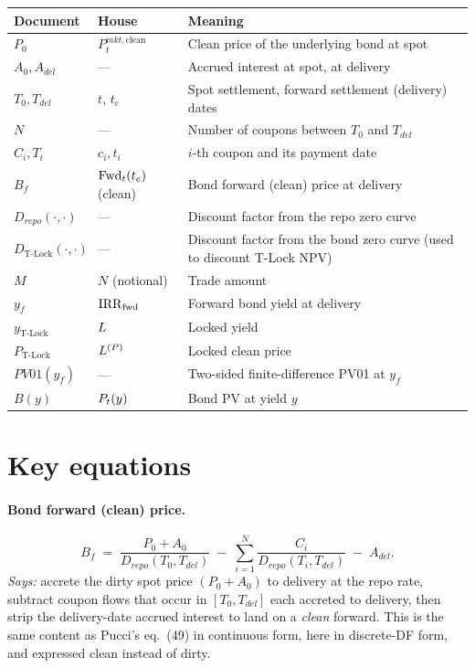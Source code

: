 \documentclass[11pt,a4paper]{article}
\begin{document}
\begin{tabular}{@{}p{3cm}p{3.5cm}p{8.5cm}@{}}
\toprule
Document         & House                  & Meaning \\
\midrule
$P_0$            & $P^{mkt,\text{clean}}_t$ & Clean price of the underlying bond at spot \\
$A_0, A_{del}$   & ---                     & Accrued interest at spot, at delivery \\
$T_0, T_{del}$   & $t$, $t_e$              & Spot settlement, forward settlement (delivery) dates \\
$N$              & ---                     & Number of coupons between $T_0$ and $T_{del}$ \\
$C_i, T_i$       & $c_i, t_i$              & $i$-th coupon and its payment date \\
$B_f$            & $\mathrm{Fwd}_{t}(t_e)$ (clean) & Bond forward (clean) price at delivery \\
$D_{repo}(\cdot,\cdot)$ & ---              & Discount factor from the repo zero curve \\
$D_{\text{T-Lock}}(\cdot,\cdot)$ & ---     & Discount factor from the bond zero curve (used to discount T-Lock NPV) \\
$M$              & $N$ (notional)          & Trade amount \\
$y_f$            & $\mathrm{IRR}_{\text{fwd}}$     & Forward bond yield at delivery \\
$y_{\text{T-Lock}}$ & $L$              & Locked yield \\
$P_{\text{T-Lock}}$ & $L^{(P)}$        & Locked clean price \\
$PV01(y_f)$      & ---                     & Two-sided finite-difference PV01 at $y_f$ \\
$B(y)$           & $P_{t}(y)$           & Bond PV at yield $y$ \\
\bottomrule
\end{tabular}

\section{Key equations}

\paragraph{Bond forward (clean) price.}
\begin{equation}\label{eq:fwd-clean}
  B_f \;=\; \frac{P_0 + A_0}{D_{repo}(T_0, T_{del})}
          \;-\; \sum_{i=1}^{N} \frac{C_i}{D_{repo}(T_i, T_{del})}
          \;-\; A_{del}.
\end{equation}
\textit{Says:} accrete the dirty spot price $(P_0 + A_0)$ to delivery
at the repo rate, subtract coupon flows that occur in $[T_0, T_{del}]$
each accreted to delivery, then strip the delivery-date accrued
interest to land on a \emph{clean} forward. This is the same content
as Pucci's eq.~(49) in continuous form, here in discrete-DF form, and
expressed clean instead of dirty.
\end{document}
